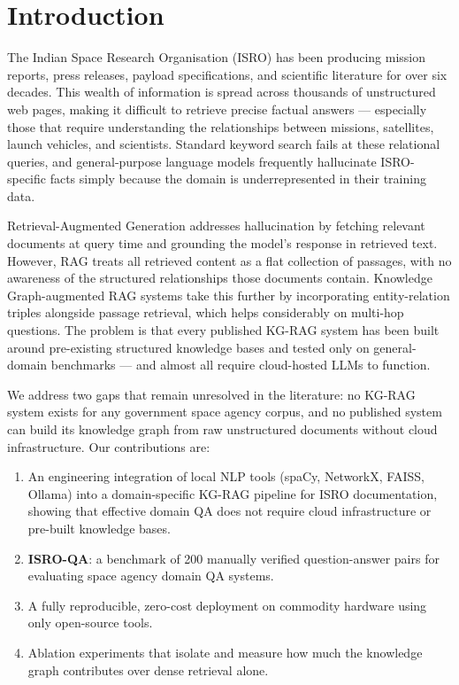 \documentclass[conference]{IEEEtran}
\begin{document}
\section{Introduction}

The Indian Space Research Organisation (ISRO) has been producing mission reports, press releases, payload specifications, and scientific literature for over six decades. This wealth of information is spread across thousands of unstructured web pages, making it difficult to retrieve precise factual answers — especially those that require understanding the relationships between missions, satellites, launch vehicles, and scientists. Standard keyword search fails at these relational queries, and general-purpose language models frequently hallucinate ISRO-specific facts simply because the domain is underrepresented in their training data.

Retrieval-Augmented Generation \cite{lewis2020rag} addresses hallucination by fetching relevant documents at query time and grounding the model's response in retrieved text. However, RAG treats all retrieved content as a flat collection of passages, with no awareness of the structured relationships those documents contain. Knowledge Graph-augmented RAG systems \cite{he2024gretriever, edge2024graphrag, guo2024lightrag, ma2024tog2} take this further by incorporating entity-relation triples alongside passage retrieval, which helps considerably on multi-hop questions. The problem is that every published KG-RAG system has been built around pre-existing structured knowledge bases and tested only on general-domain benchmarks — and almost all require cloud-hosted LLMs to function.

We address two gaps that remain unresolved in the literature: no KG-RAG system exists for any government space agency corpus, and no published system can build its knowledge graph from raw unstructured documents without cloud infrastructure. Our contributions are:

\begin{enumerate}
    \item An engineering integration of local NLP tools (spaCy, NetworkX, FAISS, Ollama) into a domain-specific KG-RAG pipeline for ISRO documentation, showing that effective domain QA does not require cloud infrastructure or pre-built knowledge bases.
    \item \textbf{ISRO-QA}: a benchmark of 200 manually verified question-answer pairs for evaluating space agency domain QA systems.
    \item A fully reproducible, zero-cost deployment on commodity hardware using only open-source tools.
    \item Ablation experiments that isolate and measure how much the knowledge graph contributes over dense retrieval alone.
\end{enumerate}
\end{document}
